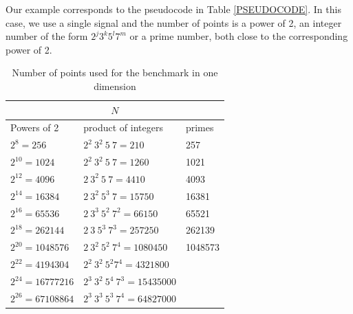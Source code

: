 \documentclass[12pt, a4paper]{article}
\begin{document}
Our example corresponds to the pseudocode in Table \ref{PSEUDOCODE}. In this case, we use a single signal and the number of points is a power of 2, an integer number of the form $2^j3^k5^l7^m$ or a prime number, both close to the corresponding power of 2.
\begin{table}[H]
\centering
\begin{tabular}{|l|l|l|}
  \hline
  \multicolumn{3}{|c|}{$N$}\\
  \hline
  \hline
Powers of 2 & product of integers & primes\\ \hline
$2^8=256$	 & $2^2\ 3^2\ 5\ 7=210$	     & 257  \\ \hline
$2^{10}=1024$	 & $2^2\ 3^2\ 5\ 7=1260$	     & 1021  \\ \hline
$2^{12}=4096$	 & $2\ 3^2\ 5\ 7=4410$	     & 4093 \\ \hline
$2^{14}=16384$	 & $2\ 3^2\ 5^3\ 7=15750$	     & 16381 \\ \hline
$2^{16}=65536$	 & $2\ 3^3\ 5^2\ 7^2=66150$      & 65521 \\ \hline
$2^{18}=262144$	 & $2\ 3\ 5^3\ 7^3=257250$       & 262139 \\ \hline
$2^{20}=1048576$  & $2\ 3^2\ 5^2\ 7^4=1080450$    & 1048573 \\ \hline
$2^{22}=4194304$  & $2^2\ 3^2\ 5^2 7^4=4321800$  &	\\ \hline
$2^{24}=16777216$ & $2^3\ 3^2\ 5^4\ 7^3=15435000$ &	\\ \hline
$2^{26}=67108864$ & $2^3\ 3^3\ 5^3\ 7^4=64827000$ &\\ \hline
\end{tabular}
\caption{Number of points used for the benchmark in one dimension}
\end{table}
\end{document}
